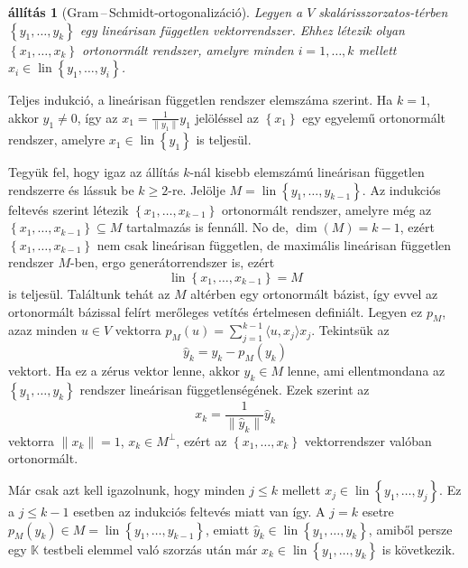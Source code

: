 \documentclass[a4paper, showtrims]{memoir}
\makeatletter
\renewenvironment{proof}[1][\proofname]
    {\par\pushQED{\qed}%
    \normalfont \topsep6\p@\@plus6\p@\relax
    \trivlist
    \item[\hskip\labelsep
        \itshape
    #1\@addpunct{:}]\ignorespaces}
    {\popQED\endtrivlist\@endpefalse}
\theoremstyle{plain}
\newtheorem{proposition}{állítás}[chapter]
\theoremstyle{remark}
\theoremstyle{definition}
\DeclareMathOperator{\lin}{lin}
\newcommand{\ip}[2]{\langle#1,#2\rangle}
\makeatother
\begin{document}
\begin{proposition}[Gram\,--\,Schmidt-ortogonalizáció]\label{pr:GS}
	Legyen a $V$ skalárisszorzatos-térben $\left\{ y_1,\ldots,y_k \right\}$ egy lineárisan független
	vektorrendszer.
	Ehhez létezik olyan $\left\{ x_1,\ldots,x_k \right\}$ ortonormált rendszer,
	amelyre minden $i=1,\ldots,k$ mellett $x_i\in\lin\left\{ y_1,\ldots,y_i \right\}$.
\end{proposition}
\begin{proof}
	Teljes indukció, a lineárisan független rendszer elemszáma szerint.
	Ha $k=1$, akkor $y_1\neq 0$, így az $x_1=\frac{1}{\|y_1\|}y_1$ jelöléssel az
	$\left\{ x_1 \right\}$ egy egyelemű ortonormált rendszer, amelyre $x_1\in\lin\left\{ y_1 \right\}$ is teljesül.

	Tegyük fel, hogy igaz az állítás $k$-nál kisebb elemszámú lineárisan független rendszerre és lássuk be $k\geq 2$-re.
	Jelölje $M=\lin\left\{ y_1,\ldots,y_{k-1} \right\}$.
	Az indukciós feltevés szerint létezik $\left\{ x_1,\ldots,x_{k-1} \right\}$ ortonormált rendszer,
	amelyre még az
	\begin{math}
		\left\{ x_1,\ldots,x_{k-1} \right\}\subseteq M
	\end{math}
	tartalmazás is fennáll.
	No de, $\dim(M)=k-1$, ezért $\left\{ x_1,\ldots,x_{k-1} \right\}$ nem csak lineárisan független,
	de maximális lineárisan független rendszer $M$-ben, ergo generátorrendszer is, ezért
	\[
		\lin\left\{ x_1,\ldots,x_{k-1} \right\}=M
	\]
	is teljesül.
	Találtunk tehát az $M$ altérben egy ortonormált bázist,
	így evvel az ortonormált bázissal felírt merőleges vetítés értelmesen definiált.
	Legyen ez $p_M$, azaz minden $u\in V$ vektorra $p_M\left( u \right)=\sum_{j=1}^{k-1}\ip{u}{x_j}x_j$.
	Tekintsük az
	\[
		\hat{y}_k=y_k-p_M\left( y_k \right)
	\]
	vektort.
	Ha ez a zérus vektor lenne, akkor $y_k\in M$ lenne, ami ellentmondana az $\left\{ y_1,\ldots,y_k \right\}$ rendszer
	lineárisan függetlenségének.
	Ezek szerint az
	\[
		x_k
		=
		\frac{1}{\|\hat{y}_k\|}\hat{y}_k
	\]
	vektorra $\|x_k\|=1$, $x_k\in M^\perp$, ezért az $\left\{ x_1,\ldots,x_k \right\}$ vektorrendszer valóban ortonormált.

	Már csak azt kell igazolnunk, hogy minden $j\leq k$ mellett $x_j\in\lin\left\{ y_1,\ldots,y_j \right\}$.
	Ez a $j\leq k-1$ esetben az indukciós feltevés miatt van így.
	A $j=k$ esetre $p_M\left( y_k \right)\in M=\lin\left\{ y_1,\ldots,y_{k-1} \right\}$,
	emiatt $\hat{y}_k\in\lin\left\{ y_1,\ldots,y_k \right\}$,
	amiből persze egy $\mathbb{K}$ testbeli elemmel való szorzás után már $x_k\in\lin\left\{ y_1,\ldots,y_k \right\}$ is következik.
\end{proof}
\end{document}
